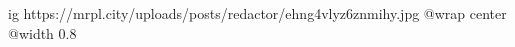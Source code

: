  
 
 
 
 

\ifcmt
  ig https://mrpl.city/uploads/posts/redactor/ehng4vlyz6znmihy.jpg
  @wrap center
  @width 0.8
\fi
